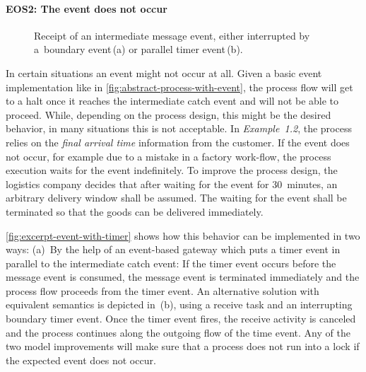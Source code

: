 \paragraph{EOS2: The event does not occur}

\begin{figure}[bth]
	\myfloatalign
	 \quad
	\caption[Tu duo titulo debitas latente]{Receipt of an intermediate message event, either interrupted by a~boundary event\,(a) or parallel timer event\,(b).}
	\label{fig:excerpt-event-with-timer}
\end{figure}

In certain situations an event might not occur at all. Given a basic event implementation like in \autoref{fig:abstract-process-with-event}, the process flow will get to a halt once it reaches the intermediate catch event and will not be able to proceed. While, depending on the process design, this might be the desired behavior, in many situations this is not acceptable.
In \textit{Example~1.2}, the process relies on the \textit{final arrival time} information from the customer. If the event does not occur, for example due to a mistake in a factory work-flow, the process execution waits for the event indefinitely.
To improve the process design, the logistics company decides that after waiting for the event for 30~minutes, an arbitrary delivery window shall be assumed. The waiting for the event shall be terminated so that the goods can be delivered immediately.

\autoref{fig:excerpt-event-with-timer} shows how this behavior can be implemented in two ways: (a)~By the help of an event-based gateway which puts a timer event in parallel to the intermediate catch event: If the timer event occurs before the message event is consumed, the message event is terminated immediately and the process flow proceeds from the timer event.
An alternative solution with equivalent semantics is depicted in~(b), using a receive task and an interrupting boundary timer event. Once the timer event fires, the receive activity is canceled and the process continues along the outgoing flow of the time event.
Any of the two model improvements will make sure that a process does not run into a lock if the expected event does not occur.


